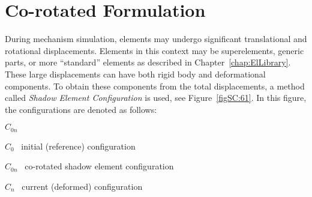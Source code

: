 %
%

%
%

\chapter{Co-rotated Formulation}
\label{chap:SupElCorot}

During mechanism simulation, elements may undergo
significant translational and rotational displacements.
Elements in this context may be superelements, generic parts,
or more ``standard'' elements as described in Chapter~\ref{chap:ElLibrary}.
These large displacements can have both rigid body and deformational components.
To obtain these components from the total displacements, a method called
{\it Shadow Element Configuration} is used, see Figure~\ref{figSC:61}.
In this figure, the configurations are denoted as follows:
%
\begin{namelist}{$C_{0n}$}
\item[$C_0 $]   \mdash~initial (reference) configuration
\item[$C_{0n}$] \mdash~co-rotated shadow element configuration
\item[$C_n $]   \mdash~current (deformed) configuration
\end{namelist}
%
